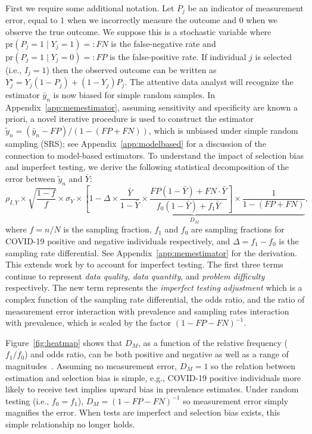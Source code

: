 \documentclass[11pt]{amsart}
\numberwithin{equation}{section}
\theoremstyle{plain}
\def\pr{\text{pr}}
\begin{document}
First we require some additional notation.  Let $P_j$ be an indicator of measurement error, equal to $1$ when we incorrectly measure the outcome and $0$ when we observe the true outcome. We suppose this is a stochastic variable where $\pr(P_j = 1 \mid Y_j = 1) =: FN$ is the false-negative rate and $\pr(P_j = 1 \mid Y_j = 0) =: FP$ is the false-positive rate.  If individual $j$ is selected (i.e., $I_j = 1$) then the observed outcome can be written as $Y_j^{\star} = Y_j(1-P_j) + (1-Y_j) P_j$.  The attentive data analyst will recognize the estimator $\bar y_n$ is now biased for simple random samples.  In Appendix~\ref{app:memestimator}, assuming sensitivity and specificity are known a priori, a novel iterative procedure is used to construct the estimator $\tilde y_n = (\bar y_n - FP)/(1-(FP+FN))$, which is unbiased under simple random sampling (SRS); see Appendix~\ref{app:modelbased} for a discussion of the connection to model-based estimators. To understand the impact of selection bias and imperfect testing, we derive the following statistical decomposition of the error between $\tilde y_n$ and $\bar Y$:
\begin{equation}
\label{eq:statdecomp}
\rho_{I,Y} \times \sqrt{\frac{1-f}{f}} \times \sigma_{Y}
\times \underbrace{\left[ 1 - \Delta \times \frac{\bar Y}{1-\bar Y} \times \frac{FP(1-\bar Y) + FN \cdot \bar Y}{f_0 (1-\bar Y) + f_1 \bar Y} \right] \times \frac{1}{1-(FP+FN)}}_{D_M},
\end{equation}
where $f=n/N$ is the sampling fraction, $f_1$ and $f_0$ are sampling fractions for COVID-19 positive and negative individuals respectively, and $\Delta = f_1 - f_0$ is the sampling rate differential.  See Appendix~\ref{app:memestimator} for the derivation. This extends work by \cite{Meng2018} to account for imperfect testing. The first three terms continue to represent \emph{data quality}, \emph{data quantity}, and \emph{problem difficulty} respectively.  The new term represents the \emph{imperfect testing adjustment} which is a complex function of the sampling rate differential, the odds ratio, and the ratio of measurement error interaction with prevalence and sampling rates interaction with prevalence, which is scaled by the factor $(1 - FP - FN)^{-1}$.

Figure~\ref{fig:heatmap} shows that $D_M$, as a function of the relative frequency ($f_1/f_0$) and odds ratio, can be both positive and negative as well as a range of magnitudes~\citep{Beesley2020,Beesley2019,Smeden2019}. Assuming no measurement error, $D_M = 1$ so the relation between estimation and selection bias is simple, e.g., COVID-19 positive individuals more likely to receive test implies upward bias in prevalence estimates. Under random testing (i.e., $f_0 = f_1$), $D_M = (1-FP-FN)^{-1}$ so measurement error simply magnifies the error. When tests are imperfect and selection bias exists, this simple relationship no longer holds.
\end{document}
